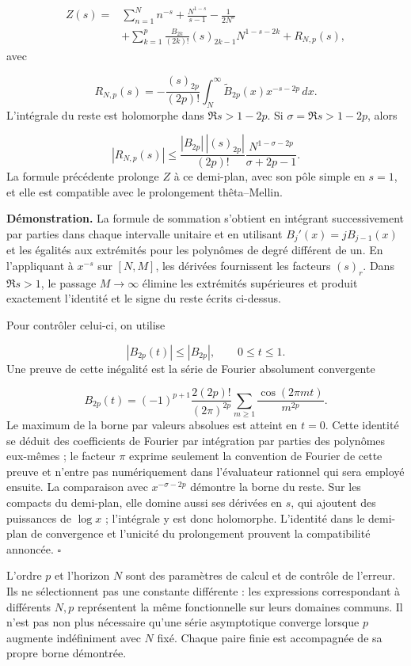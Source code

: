 \[
\begin{aligned}
Z(s)={}&\sum_{n=1}^N n^{-s}+\frac{N^{1-s}}{s-1}-\frac1{2N^s}\\
&+\sum_{k=1}^p\frac{B_{2k}}{(2k)!}(s)_{2k-1}N^{1-s-2k}
+R_{N,p}(s),
\end{aligned}
\]
avec

\[
R_{N,p}(s)=-\frac{(s)_{2p}}{(2p)!}
\int_N^\infty\widetilde B_{2p}(x)x^{-s-2p}\,dx.
\]
L'intégrale du reste est holomorphe dans \(\Re s>1-2p\). Si \(\sigma=\Re s>1-2p\), alors

\[
|R_{N,p}(s)|\leq
\frac{|B_{2p}|\,|(s)_{2p}|}{(2p)!}
\frac{N^{1-\sigma-2p}}{\sigma+2p-1}.
\]
La formule précédente prolonge \(Z\) à ce demi-plan, avec son pôle simple en \(s=1\), et elle est compatible avec le prolongement thêta–Mellin.

\textbf{Démonstration.} La formule de sommation s’obtient en intégrant successivement par parties dans chaque intervalle unitaire et en utilisant \(B_j'(x)=jB_{j-1}(x)\) et les égalités aux extrémités pour les polynômes de degré différent de un. En l’appliquant à \(x^{-s}\) sur \([N,M]\), les dérivées fournissent les facteurs \((s)_r\). Dans \(\Re s>1\), le passage \(M\to\infty\) élimine les extrémités supérieures et produit exactement l’identité et le signe du reste écrits ci-dessus.

Pour contrôler celui-ci, on utilise

\[
|B_{2p}(t)|\leq |B_{2p}|,\qquad 0\leq t\leq1.
\]
Une preuve de cette inégalité est la série de Fourier absolument convergente

\[
B_{2p}(t)=(-1)^{p+1}\frac{2(2p)!}{(2\pi)^{2p}}
\sum_{m\geq1}\frac{\cos(2\pi mt)}{m^{2p}}.
\]
Le maximum de la borne par valeurs absolues est atteint en \(t=0\). Cette identité se déduit des coefficients de Fourier par intégration par parties des polynômes eux-mêmes ; le facteur \(\pi\) exprime seulement la convention de Fourier de cette preuve et n’entre pas numériquement dans l’évaluateur rationnel qui sera employé ensuite. La comparaison avec \(x^{-\sigma-2p}\) démontre la borne du reste. Sur les compacts du demi-plan, elle domine aussi ses dérivées en \(s\), qui ajoutent des puissances de \(\log x\) ; l’intégrale y est donc holomorphe. L’identité dans le demi-plan de convergence et l’unicité du prolongement prouvent la compatibilité annoncée. \hfill\(\square\)

L'ordre \(p\) et l'horizon \(N\) sont des paramètres de calcul et de contrôle de l'erreur. Ils ne sélectionnent pas une constante différente : les expressions correspondant à différents \(N,p\) représentent la même fonctionnelle sur leurs domaines communs. Il n'est pas non plus nécessaire qu'une série asymptotique converge lorsque \(p\) augmente indéfiniment avec \(N\) fixé. Chaque paire finie est accompagnée de sa propre borne démontrée.

